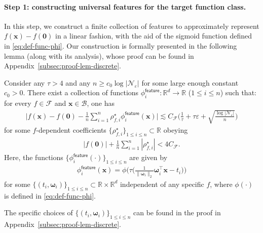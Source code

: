 \documentclass[english]{article}
\begin{document}
\paragraph{Step 1: constructing universal features for the target function class.}
In this step, we construct a finite collection of features to approximately represent $f(\bm{x})-f(\bm{0})$ in a linear fashion, with the aid of the sigmoid function defined in \eqref{eq:def-func-phi}.
Our construction is formally presented in the following lemma (along with its analysis), whose proof can be found in Appendix~\ref{subsec:proof-lem-discrete}.
%
\begin{lemma} \label{lem:discrete}
%
Consider any $\tau > 4$ and any $n \ge c_0\log|\mathcal{N}_{\varepsilon}|$ for some large enough constant $c_0>0$. There exist a collection of functions $\phi^{\mathsf{feature}}_i: \mathbb{R}^d \rightarrow \mathbb{R}$ ($1\leq i\leq n$) such that: for every $f \in \mathcal{F}$ and ${\bm x} \in \mathcal{B}$, one has 
%
\begin{align}\label{eq:lem-discrete}
\bigg|f({\bm x}) - f(\bm{0}) - \frac{1}{n}\sum_{i = 1}^n\rho^{\star}_{f, i}\phi^{\mathsf{feature}}_i(\bm{x})\bigg|
\lesssim C_{\mathcal{F}}\bigg(\frac{1}{\tau} + \tau\varepsilon + \sqrt{\frac{\log|\mathcal{N}_{\varepsilon}|}{n}}\bigg) 
\end{align}
%
for some $f$-dependent coefficients  $\{\rho^{\star}_{f,i}\}_{1\leq i\leq n} \subset \mathbb{R}$ obeying
%
\begin{align}\label{eq:lem-discrete-2}
|f({\bm 0})| + \frac{1}{n}\sum_{i = 1}^n|\rho^{\star}_{f, i}| < 4C_{\mathcal{F}}.
\end{align}
%
Here, the functions  $\{\phi^{\mathsf{feature}}_i(\cdot)\}_{1\leq i\leq n}$ are given by
%
\begin{align}
\label{eq:defn-phi-feature-lemma}
\phi_{i}^{\mathsf{feature}}(\bm{x})=\phi\bigg(\tau\Big(\frac{1}{\|\bm{\omega}_{i}\|_{2}}\bm{\omega}_{i}^{\top}\bm{x}-t_{i}\Big)\bigg)
\end{align}
%
	for some $\{(t_i, {\bm \omega}_i)\}_{1 \le i \le n} \subset \mathbb{R}\times \mathbb{R}^{d}$ independent of any specific $f$, where $\phi(\cdot)$ is defined in \eqref{eq:def-func-phi}.   
\end{lemma}
%
\begin{remark} The specific choices of  $\{(t_i, {\bm \omega}_i)\}_{1 \le i \le n} $ can be found in the proof in Appendix~\ref{subsec:proof-lem-discrete}.  \end{remark}
\end{document}
